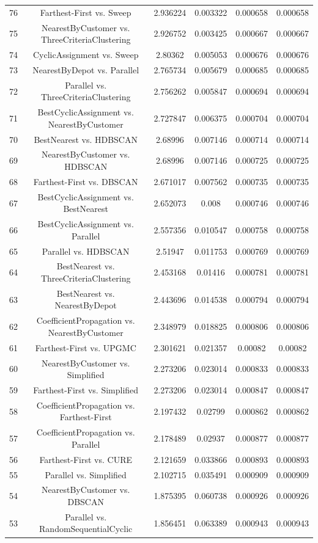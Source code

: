 \documentclass[a4paper,10pt]{article}
\begin{document}
\begin{landscape}
\begin{table}[!htp]
\begin{tabular}{cccccc}
76&Farthest-First vs. Sweep&2.936224&0.003322&0.000658&0.000658\\
75&NearestByCustomer vs. ThreeCriteriaClustering&2.926752&0.003425&0.000667&0.000667\\
74&CyclicAssignment vs. Sweep&2.80362&0.005053&0.000676&0.000676\\
73&NearestByDepot vs. Parallel&2.765734&0.005679&0.000685&0.000685\\
72&Parallel vs. ThreeCriteriaClustering&2.756262&0.005847&0.000694&0.000694\\
71&BestCyclicAssignment vs. NearestByCustomer&2.727847&0.006375&0.000704&0.000704\\
70&BestNearest vs. HDBSCAN&2.68996&0.007146&0.000714&0.000714\\
69&NearestByCustomer vs. HDBSCAN&2.68996&0.007146&0.000725&0.000725\\
68&Farthest-First vs. DBSCAN&2.671017&0.007562&0.000735&0.000735\\
67&BestCyclicAssignment vs. BestNearest&2.652073&0.008&0.000746&0.000746\\
66&BestCyclicAssignment vs. Parallel&2.557356&0.010547&0.000758&0.000758\\
65&Parallel vs. HDBSCAN&2.51947&0.011753&0.000769&0.000769\\
64&BestNearest vs. ThreeCriteriaClustering&2.453168&0.01416&0.000781&0.000781\\
63&BestNearest vs. NearestByDepot&2.443696&0.014538&0.000794&0.000794\\
62&CoefficientPropagation vs. NearestByCustomer&2.348979&0.018825&0.000806&0.000806\\
61&Farthest-First vs. UPGMC&2.301621&0.021357&0.00082&0.00082\\
60&NearestByCustomer vs. Simplified&2.273206&0.023014&0.000833&0.000833\\
59&Farthest-First vs. Simplified&2.273206&0.023014&0.000847&0.000847\\
58&CoefficientPropagation vs. Farthest-First&2.197432&0.02799&0.000862&0.000862\\
57&CoefficientPropagation vs. Parallel&2.178489&0.02937&0.000877&0.000877\\
56&Farthest-First vs. CURE&2.121659&0.033866&0.000893&0.000893\\
55&Parallel vs. Simplified&2.102715&0.035491&0.000909&0.000909\\
54&NearestByCustomer vs. DBSCAN&1.875395&0.060738&0.000926&0.000926\\
53&Parallel vs. RandomSequentialCyclic&1.856451&0.063389&0.000943&0.000943\\

\end{tabular}
\end{table}
\end{landscape}
\end{document}
